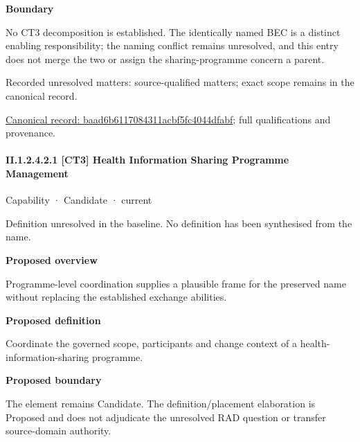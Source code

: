 \textbf{Boundary}



No CT3 decomposition is established. The identically named BEC is a distinct enabling responsibility; the naming conflict remains unresolved, and this entry does not merge the two or assign the sharing-programme concern a parent.


{\small Recorded unresolved matters: source-qualified matters; exact scope remains in the canonical record.}\par
{\footnotesize \href{../../../../../../../continuum/strategy/capability/baad6b6117084311acbf5fc4044dfabf.md}{Canonical record: baad6b6117084311acbf5fc4044dfabf}; full qualifications and provenance.}\par
\paragraph*{II.1.2.4.2.1 [CT3] Health Information Sharing Programme Management}
\label{navigation:II.1.2.4.2.1}

\label{element:6c5c2cb625414b149ac7f2ccb4b8a897}
{\small Capability · Candidate · current}\par

Definition unresolved in the baseline. No definition has been synthesised from the name.



\textbf{Proposed overview}



Programme-level coordination supplies a plausible frame for the preserved name without replacing the established exchange abilities.



\textbf{Proposed definition}



Coordinate the governed scope, participants and change context of a health-information-sharing programme.



\textbf{Proposed boundary}



The element remains Candidate. The definition/placement elaboration is Proposed and does not adjudicate the unresolved RAD question or transfer source-domain authority.



